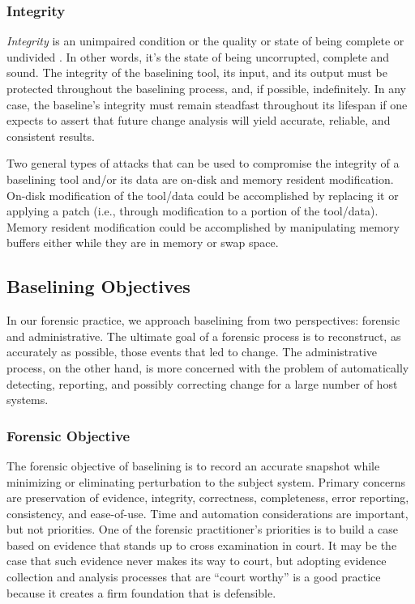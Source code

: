 \documentclass[10pt]{article}
\begin{document}
\subsubsection{Integrity}

{\it Integrity} is an unimpaired condition or the quality or state of
being complete or undivided \cite{dictionary}.  In other words, it's
the state of being uncorrupted, complete and sound.  The integrity of
the baselining tool, its input, and its output must be protected
throughout the baselining process, and, if possible, indefinitely.  In
any case, the baseline's integrity must remain steadfast throughout
its lifespan if one expects to assert that future change analysis will
yield accurate, reliable, and consistent results.

Two general types of attacks that can be used to compromise the
integrity of a baselining tool and/or its data are on-disk and memory
resident modification.  On-disk modification of the tool/data could be
accomplished by replacing it or applying a patch (i.e., through
modification to a portion of the tool/data).  Memory resident
modification could be accomplished by manipulating memory buffers
either while they are in memory or swap space.

\subsection{Baselining Objectives}

In our forensic practice, we approach baselining from two
perspectives: forensic and administrative.  The ultimate goal of a
forensic process is to reconstruct, as accurately as possible, those
events that led to change.  The administrative process, on the other
hand, is more concerned with the problem of automatically detecting,
reporting, and possibly correcting change for a large number of host
systems.

\subsubsection{Forensic Objective}

The forensic objective of baselining is to record an accurate snapshot
while minimizing or eliminating perturbation to the subject system.
Primary concerns are preservation of evidence, integrity, correctness,
completeness, error reporting, consistency, and ease-of-use.  Time and
automation considerations are important, but not priorities.  One of
the forensic practitioner's priorities is to build a case based on
evidence that stands up to cross examination in court.  It may be the
case that such evidence never makes its way to court, but adopting
evidence collection and analysis processes that are ``court worthy''
is a good practice because it creates a firm foundation that is
defensible.
\end{document}
